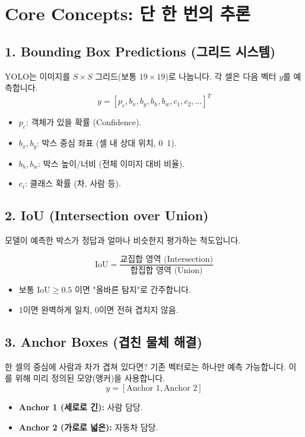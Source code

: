 \documentclass[11pt,a4paper]{book}
\theoremstyle{definition}
\begin{document}
\section{Core Concepts: 단 한 번의 추론}

\subsection{1. Bounding Box Predictions (그리드 시스템)}


YOLO는 이미지를 $S \times S$ 그리드(보통 $19 \times 19$)로 나눕니다.
각 셀은 다음 벡터 $y$를 예측합니다.
$$ y = [p_c, b_x, b_y, b_h, b_w, c_1, c_2, \dots]^T $$
\begin{itemize}
    \item $p_c$: 객체가 있을 확률 (Confidence).
    \item $b_x, b_y$: 박스 중심 좌표 (셀 내 상대 위치, 0~1).
    \item $b_h, b_w$: 박스 높이/너비 (전체 이미지 대비 비율).
    \item $c_i$: 클래스 확률 (차, 사람 등).
\end{itemize}

\subsection{2. IoU (Intersection over Union)}


모델이 예측한 박스가 정답과 얼마나 비슷한지 평가하는 척도입니다.
\begin{formulabox}[title={IoU 수식}]
$$ \text{IoU} = \frac{\text{교집합 영역 (Intersection)}}{\text{합집합 영역 (Union)}} $$
\begin{itemize}
    \item 보통 $\text{IoU} \ge 0.5$ 이면 "올바른 탐지"로 간주합니다.
    \item 1이면 완벽하게 일치, 0이면 전혀 겹치지 않음.
\end{itemize}
\end{formulabox}

\subsection{3. Anchor Boxes (겹친 물체 해결)}
한 셀의 중심에 사람과 차가 겹쳐 있다면?
기존 벡터로는 하나만 예측 가능합니다. 이를 위해 미리 정의된 모양(앵커)을 사용합니다.
$$ y = [\text{Anchor 1}, \text{Anchor 2}] $$
\begin{itemize}
    \item \textbf{Anchor 1 (세로로 긴):} 사람 담당.
    \item \textbf{Anchor 2 (가로로 넓은):} 자동차 담당.
\end{itemize}
\end{document}
